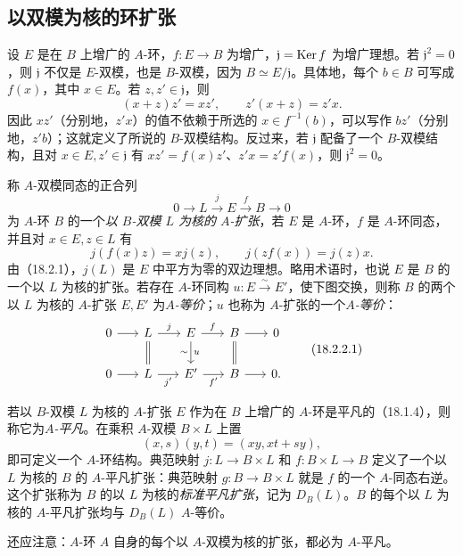 \subsection{以双模为核的环扩张}
设 $E$ 是在 $B$ 上增广的 $A$-环，$f:E\to B$ 为增广，$\mathfrak j=\operatorname{Ker} f$ 为增广理想。若 $\mathfrak j^2=0$，则 $\mathfrak j$ 不仅是 $E$-双模，也是 $B$-双模，因为 $B\simeq E/\mathfrak j$。具体地，每个 $b\in B$ 可写成 $f(x)$，其中 $x\in E$。若 $z,z'\in\mathfrak j$，则
\[
 (x+z)z'=xz',\qquad z'(x+z)=z'x.
\]
因此 $xz'$（分别地，$z'x$）的值不依赖于所选的 $x\in f^{-1}(b)$，可以写作 $bz'$（分别地，$z'b$）；这就定义了所说的 $B$-双模结构。反过来，若 $\mathfrak j$ 配备了一个 $B$-双模结构，且对 $x\in E,z'\in\mathfrak j$ 有 $xz'=f(x)z'$、$z'x=z'f(x)$，则 $\mathfrak j^2=0$。

称 $A$-双模同态的正合列
\[
 0\longrightarrow L\xrightarrow{j}E\xrightarrow{f}B\longrightarrow0
\]
为 $A$-环 $B$ 的一个\emph{以 $B$-双模 $L$ 为核的 $A$-扩张}，若 $E$ 是 $A$-环，$f$ 是 $A$-环同态，并且对 $x\in E,z\in L$ 有
\[
 j(f(x)z)=xj(z),\qquad j(zf(x))=j(z)x.
\]
由（18.2.1），$j(L)$ 是 $E$ 中平方为零的双边理想。略用术语时，也说 $E$ 是 $B$ 的一个以 $L$ 为核的扩张。若存在 $A$-环同构 $u:E\xrightarrow{\sim}E'$，使下图交换，则称 $B$ 的两个以 $L$ 为核的 $A$-扩张 $E,E'$ 为\emph{$A$-等价}；$u$ 也称为 $A$-扩张的一个\emph{$A$-等价}：
\begin{equation}
\begin{tikzcd}[column sep=1.7em]
0\arrow[r]&L\arrow[r,"j"]\arrow[d,equal]&E\arrow[r,"f"]\arrow[d,"u","\sim"']&B\arrow[r]\arrow[d,equal]&0\\
0\arrow[r]&L\arrow[r,"j'"']&E'\arrow[r,"f'"']&B\arrow[r]&0.
\end{tikzcd}
\tag{18.2.2.1}
\end{equation}

若以 $B$-双模 $L$ 为核的 $A$-扩张 $E$ 作为在 $B$ 上增广的 $A$-环是平凡的（18.1.4），则称它为\emph{$A$-平凡}。在乘积 $A$-双模 $B\times L$ 上置
\[
 (x,s)(y,t)=(xy,xt+sy),
\]
即可定义一个 $A$-环结构。典范映射 $j:L\to B\times L$ 和 $f:B\times L\to B$ 定义了一个以 $L$ 为核的 $B$ 的 $A$-平凡扩张：典范映射 $g:B\to B\times L$ 就是 $f$ 的一个 $A$-同态右逆。这个扩张称为 $B$ 的以 $L$ 为核的\emph{标准平凡扩张}，记为 $D_B(L)$。$B$ 的每个以 $L$ 为核的 $A$-平凡扩张均与 $D_B(L)$ $A$-等价。

还应注意：$A$-环 $A$ 自身的每个以 $A$-双模为核的扩张，都必为 $A$-平凡。

